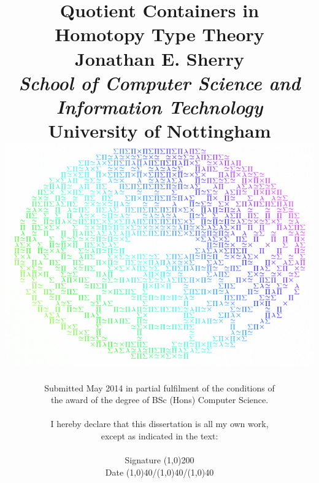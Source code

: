 \documentclass[12pt]{report}
\begin{document}
\setcounter{page}{-100}
\date{}
\title{\textbf{Quotient Containers in\\ Homotopy Type Theory\\}
Jonathan E. Sherry\\
\vspace{10pt}
    { \large
    \textit{School of Computer Science and Information Technology}\\
    \textbf{University of Nottingham}\\
    }
\vspace{45pt}
\includegraphics[scale=0.45]{1.png}\\
}
\author{Submitted May 2014 in partial fulfilment of the conditions of\\
the award of the degree of BSc (Hons) Computer Science.\\
\\
I hereby declare that this dissertation is all my own work,\\
except as indicated in the text:\\
\\
Signature \line(1,0){200}\\
Date \line(1,0){40}/\line(1,0){40}/\line(1,0){40}\\
}

\thispagestyle{empty}
\maketitle

\tableofcontents

\pagestyle{fancy}
\lhead[]{\thepage}
\rhead[\thepage]{}
\end{document}
